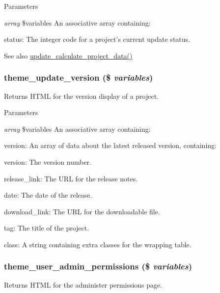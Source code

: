 \begin{DoxyParams}{Parameters}
\item[{\em array}]\$variables An associative array containing:
\begin{DoxyItemize}
\item status: The integer code for a project's current update status.
\end{DoxyItemize}\end{DoxyParams}
\begin{DoxySeeAlso}{See also}
\hyperlink{update_8compare_8inc_aa0663304dc4634e4109c896f214ea791}{update\_\-calculate\_\-project\_\-data()} 
\end{DoxySeeAlso}
\hypertarget{group__themeable_ga04407a35c1e7805fa3db729df5857903}{
\subsubsection[{theme\_\-update\_\-version}]{\setlength{\rightskip}{0pt plus 5cm}theme\_\-update\_\-version (\$ {\em variables})}}
\label{group__themeable_ga04407a35c1e7805fa3db729df5857903}
Returns HTML for the version display of a project.


\begin{DoxyParams}{Parameters}
\item[{\em array}]\$variables An associative array containing:
\begin{DoxyItemize}
\item version: An array of data about the latest released version, containing:
\begin{DoxyItemize}
\item version: The version number.
\item release\_\-link: The URL for the release notes.
\item date: The date of the release.
\item download\_\-link: The URL for the downloadable file.
\end{DoxyItemize}
\item tag: The title of the project.
\item class: A string containing extra classes for the wrapping table. 
\end{DoxyItemize}\end{DoxyParams}
\hypertarget{group__themeable_gad8be4d71043b96d113f321c62f457765}{
\subsubsection[{theme\_\-user\_\-admin\_\-permissions}]{\setlength{\rightskip}{0pt plus 5cm}theme\_\-user\_\-admin\_\-permissions (\$ {\em variables})}}
\label{group__themeable_gad8be4d71043b96d113f321c62f457765}
Returns HTML for the administer permissions page.



